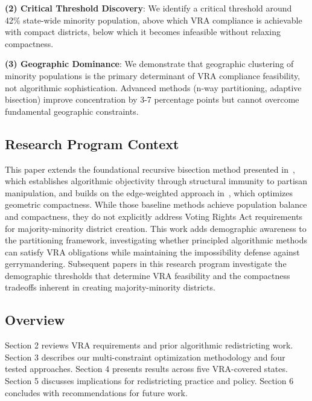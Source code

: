 \textbf{(2) Critical Threshold Discovery}: We identify a critical threshold around 42\% state-wide minority population, above which VRA compliance is achievable with compact districts, below which it becomes infeasible without relaxing compactness.

\textbf{(3) Geographic Dominance}: We demonstrate that geographic clustering of minority populations is the primary determinant of VRA compliance feasibility, not algorithmic sophistication. Advanced methods (n-way partitioning, adaptive bisection) improve concentration by 3-7 percentage points but cannot overcome fundamental geographic constraints.

\subsection{Research Program Context}

This paper extends the foundational recursive bisection method presented in~\cite{della-libera-recursive-bisection}, which establishes algorithmic objectivity through structural immunity to partisan manipulation, and builds on the edge-weighted approach in~\cite{della-libera-edge-weighted}, which optimizes geometric compactness. While those baseline methods achieve population balance and compactness, they do not explicitly address Voting Rights Act requirements for majority-minority district creation. This work adds demographic awareness to the partitioning framework, investigating whether principled algorithmic methods can satisfy VRA obligations while maintaining the impossibility defense against gerrymandering. Subsequent papers in this research program investigate the demographic thresholds that determine VRA feasibility and the compactness tradeoffs inherent in creating majority-minority districts.

\subsection{Overview}

Section 2 reviews VRA requirements and prior algorithmic redistricting work. Section 3 describes our multi-constraint optimization methodology and four tested approaches. Section 4 presents results across five VRA-covered states. Section 5 discusses implications for redistricting practice and policy. Section 6 concludes with recommendations for future work.
